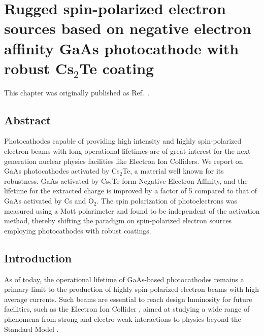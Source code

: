 \chapter{Rugged spin-polarized electron sources based on negative electron affinity {{GaAs}} photocathode with robust {{Cs$_2$Te}} coating}

This chapter was originally published as Ref.~\cite{bae2018_RuggedSpinpolarizedElectron}.

\section{Abstract}
Photocathodes capable of providing high intensity and highly spin-polarized electron beams with long operational lifetimes are of great interest for the next generation nuclear physics facilities like Electron Ion Colliders. We report on GaAs photocathodes activated by Cs$_2$Te, a material well known for its robustness. GaAs activated by Cs$_2$Te form Negative Electron Affinity, and the lifetime for the extracted charge is improved by a factor of 5 compared to that of GaAs activated by Cs and O$_2$. The spin polarization of photoelectrons was measured using a Mott polarimeter and found to be independent of the activation method, thereby shifting the paradigm on spin-polarized electron sources employing photocathodes with robust coatings.

\section{Introduction}
As of today, the operational lifetime of GaAs-based photocathodes remains a primary limit to the production of highly spin-polarized electron beams with high average currents. Such beams are essential to reach design luminosity for future facilities, such as the Electron Ion Collider \cite{eic}, aimed at studying a wide range of phenomena from strong and electro-weak interactions to physics beyond the Standard Model \cite{lrpns,nsac,mccarter2014_MeasurementElectronBeam}.

